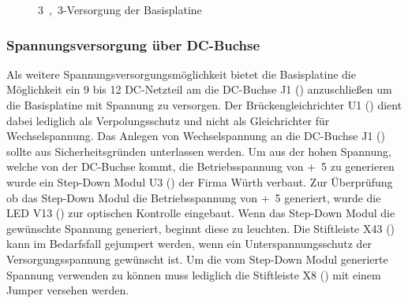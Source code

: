 \begin{figure}[H]
    \centering
    \qquad
    \qquad
    \caption[\unit{3,3}{\volt}-Versorgung der Basisplatine]{\unit{3,3}{\volt}-Versorgung der \gls{Basisplatine}}
    \label{fig:basisplatine-3v3}
\end{figure}

\subsubsection{Spannungsversorgung über DC-Buchse}
Als weitere Spannungsversorgungsmöglichkeit bietet die \gls{Basisplatine} die Möglichkeit ein \unit{9}{\volt} bis \unit{12}{\volt} DC-Netzteil am die DC-Buchse J1 () anzuschließen um die Basisplatine mit Spannung zu versorgen. Der Brückengleichrichter U1 () dient dabei lediglich als Verpolungsschutz und nicht als Gleichrichter für Wechselspannung. Das Anlegen von Wechselspannung an die DC-Buchse J1 () sollte aus Sicherheitsgründen unterlassen werden. Um aus der hohen Spannung, welche von der DC-Buchse kommt, die Betriebsspannung von \unit{+5}{\volt} zu generieren wurde ein Step-Down Modul U3 () der Firma Würth verbaut. Zur Überprüfung ob das Step-Down Modul die Betriebsspannung von \unit{+5}{\volt} generiert, wurde die LED V13 () zur optischen Kontrolle eingebaut. Wenn das Step-Down Modul die gewünschte Spannung generiert, beginnt diese zu leuchten. Die Stiftleiste X43 () kann im Bedarfsfall gejumpert werden, wenn ein Unterspannungsschutz der Versorgungsspannung gewünscht ist. Um die vom Step-Down Modul generierte Spannung verwenden zu können muss lediglich die Stiftleiste X8 () mit einem Jumper versehen werden.

